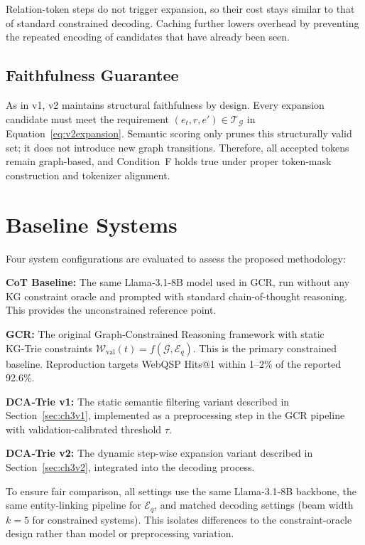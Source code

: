 Relation-token steps do not trigger expansion, so their cost stays similar to that of standard constrained decoding. Caching further lowers overhead by preventing the repeated encoding of candidates that have already been seen.

\subsection{Faithfulness Guarantee}

As in v1, v2 maintains structural faithfulness by design. Every expansion candidate must meet the requirement $(e_t, r, e') \in \mathcal{T}_{\mathcal{G}}$ in Equation~\eqref{eq:v2expansion}. Semantic scoring only prunes this structurally valid set; it does not introduce new graph transitions. Therefore, all accepted tokens remain graph-based, and Condition~F holds true under proper token-mask construction and tokenizer alignment.

\section{Baseline Systems}
\label{sec:ch3baseline}

Four system configurations are evaluated to assess the proposed methodology:

\textbf{CoT Baseline:} The same Llama‑3.1‑8B model \citep{dubey2024llama3} used in GCR, run without any KG constraint oracle and prompted with standard chain-of-thought reasoning. This provides the unconstrained reference point.

\textbf{GCR:} The original Graph‑Constrained Reasoning framework \citep{luo2025-graph-constrained-reasoning} with static KG‑Trie constraints $\mathcal{W}_{\text{val}}(t)=f(\mathcal{G},\mathcal{E}_q)$. This is the primary constrained baseline. Reproduction targets WebQSP Hits@1 within 1--2\% of the reported 92.6\%.

\textbf{DCA‑Trie v1:} The static semantic filtering variant described in Section~\ref{sec:ch3v1}, implemented as a preprocessing step in the GCR pipeline with validation-calibrated threshold $\tau$.

\textbf{DCA‑Trie v2:} The dynamic step-wise expansion variant described in Section~\ref{sec:ch3v2}, integrated into the decoding process.

To ensure fair comparison, all settings use the same Llama‑3.1‑8B backbone, the same entity-linking pipeline for $\mathcal{E}_q$, and matched decoding settings (beam width $k=5$ for constrained systems). This isolates differences to the constraint-oracle design rather than model or preprocessing variation.

